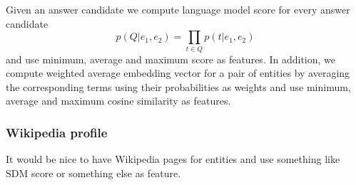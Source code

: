 Given an answer candidate we compute language model score for every answer candidate $$p(Q|e_1, e_2) = \prod_{t\in Q} p(t | e_1, e_2)$$ and use minimum, average and maximum score as features.
In addition, we compute weighted average embedding vector for a pair of entities by averaging the corresponding terms using their probabilities as weights and use minimum, average and maximum cosine similarity as features.

\subsubsection{Wikipedia profile}
It would be nice to have Wikipedia pages for entities and use something like SDM score or something else as feature.